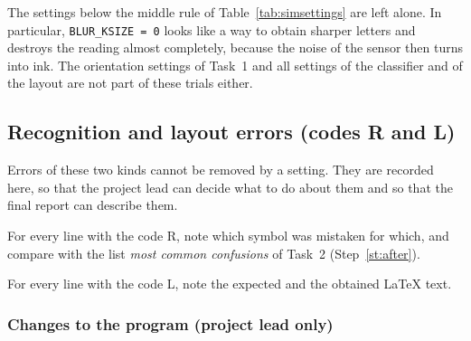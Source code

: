 \begin{caution}
The settings below the middle rule of Table~\ref{tab:simsettings} are left alone. In
particular, \texttt{BLUR\_KSIZE = 0} looks like a way to obtain sharper letters and destroys
the reading almost completely, because the noise of the sensor then turns into ink. The
orientation settings of Task~1 and all settings of the classifier and of the layout are not
part of these trials either.
\end{caution}

\subsection{Recognition and layout errors (codes R and L)}
\label{sec:rl}

Errors of these two kinds cannot be removed by a setting. They are recorded here, so that the
project lead can decide what to do about them and so that the final report can describe them.

For every line with the code R, note which symbol was mistaken for which, and compare with the
list \emph{most common confusions} of Task~2 (Step~\ref{st:after}).

For every line with the code L, note the expected and the obtained \LaTeX{} text.

\subsubsection*{Changes to the program (project lead only)}

